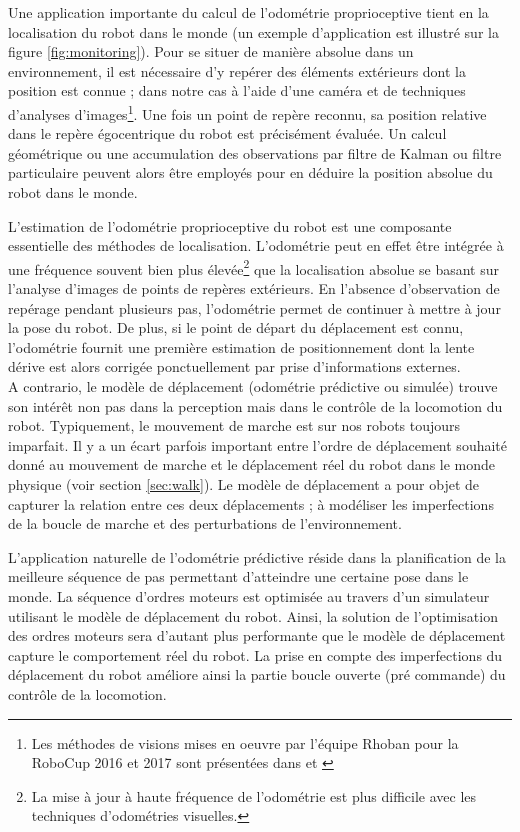 Une application importante du calcul de l'odométrie proprioceptive tient 
en la localisation du robot dans le monde
(un exemple d'application est illustré sur la figure \ref{fig:monitoring}).
Pour se situer de manière absolue dans 
un environnement, il est nécessaire d'y repérer des éléments extérieurs dont 
la position est connue ; dans notre cas à l'aide d'une caméra
et de techniques d'analyses d'images\footnote{
Les méthodes de visions mises en oeuvre par l'équipe Rhoban 
pour la RoboCup 2016 et 2017 sont présentées 
dans \cite{ChampionPaperRoboCup2016} et \cite{TDPRoboCup2017}}.
Une fois un point de repère reconnu, sa position relative dans
le repère égocentrique du robot est précisément évaluée.
Un calcul géométrique ou une accumulation des observations 
par filtre de Kalman ou filtre particulaire peuvent alors être employés 
pour en déduire la position absolue du robot dans le monde.

L'estimation de l'odométrie proprioceptive du robot est une composante
essentielle des méthodes de localisation.
L'odométrie peut en effet être intégrée à une fréquence souvent
bien plus élevée\footnote{La mise à jour à haute 
fréquence de l'odométrie est plus difficile avec les techniques d'odométries visuelles.}
que la localisation absolue se basant sur
l'analyse d'images de points de repères extérieurs.
En l'absence d'observation de repérage pendant plusieurs pas, 
l'odométrie permet de continuer à mettre à jour la pose du robot.
De plus, si le point de départ du déplacement est connu, l'odométrie fournit 
une première estimation de positionnement dont la lente dérive est alors 
corrigée ponctuellement par prise d'informations externes.\\

A contrario, le modèle de déplacement (odométrie prédictive ou simulée) 
trouve son intérêt non pas dans la perception mais dans le contrôle de 
la locomotion du robot.
Typiquement, le mouvement de marche est sur nos robots
toujours imparfait.
Il y a un écart parfois important entre l'ordre de déplacement 
souhaité donné au mouvement de marche et le déplacement réel du robot 
dans le monde physique (voir section \ref{sec:walk}).
Le modèle de déplacement a pour objet de capturer la relation
entre ces deux déplacements ; à modéliser les imperfections
de la boucle de marche et des perturbations de l'environnement.

L'application naturelle de l'odométrie prédictive réside dans
la planification de la meilleure séquence de pas permettant d'atteindre 
une certaine pose dans le monde.
La séquence d'ordres moteurs est optimisée au travers d'un simulateur
utilisant le modèle de déplacement du robot.
Ainsi, la solution de l'optimisation des ordres moteurs sera 
d'autant plus performante que le modèle de déplacement capture 
le comportement réel du robot.
La prise en compte des imperfections du déplacement du robot
améliore ainsi la partie boucle ouverte (pré commande) du contrôle 
de la locomotion.\\

